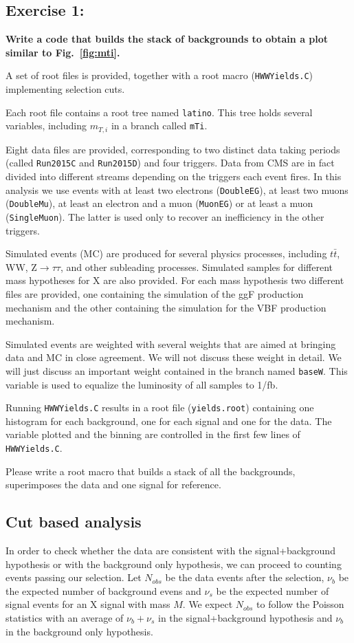 \documentclass[a4paper,12pt]{article}
\begin{document}
\subsection*{Exercise 1: }
{\bf Write a code that builds the stack of backgrounds to obtain a plot
similar to Fig.~\ref{fig:mti}.}

A set of root files is provided, together with a root macro
(\verb;HWWYields.C;) implementing selection cuts.

Each root file contains a root tree named \verb;latino;. This tree holds
several variables, including $m_{T,i}$ in a branch called \verb;mTi;.

Eight data files are provided, corresponding to two distinct data taking periods
(called \verb;Run2015C; and \verb;Run2015D;) and four triggers. Data from CMS
are in fact divided into different streams depending on the triggers each
event fires. In this analysis we use events with at least two electrons
(\verb;DoubleEG;), at least two muons (\verb;DoubleMu;), at least an electron and a muon
(\verb;MuonEG;) or at least a muon  (\verb;SingleMuon;). The latter is used
only to recover an inefficiency in the other triggers.

Simulated events (MC) are produced for several physics processes, including
$t\bar{t}$, WW, Z$\rightarrow{}\tau\tau$, and other subleading processes.
Simulated samples for different mass hypotheses for X are also provided. For
each mass hypothesis two different files are provided, one containing the
simulation of the ggF production mechanism and the other containing the
simulation for the VBF production mechanism.

Simulated events are weighted with several weights that are aimed at bringing
data and MC in close agreement. We will not discuss these weight in detail. We
will just discuss an important weight contained in the branch named
\verb;baseW;. This variable is used to equalize the
luminosity of all samples to 1/fb.

Running \verb;HWWYields.C; results in a root file (\verb;yields.root;)
containing one histogram for each background, one for each signal and one for the
data. The variable plotted and the binning are controlled in the first few
lines of \verb;HWWYields.C;.

Please write a root macro that builds a stack of all the backgrounds,
superimposes the data and one signal for reference.

\subsection{Cut based analysis}
In order to check whether the data are consistent with the signal+background
hypothesis or with the background only hypothesis, we can proceed to counting
events passing our selection. Let $N_{obs}$ be the data events after the
selection, $\nu_b$ be the expected number of background evens and $\nu_s$ be
the expected number of signal events for an X signal with mass $M$. 
We expect $N_{obs}$ to follow the Poisson statistics with an average of
$\nu_b+\nu_s$ in the signal+background hypothesis and $\nu_b$ in the
background only hypothesis.
\end{document}
